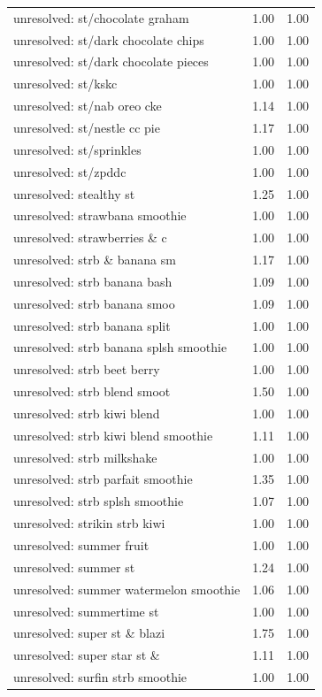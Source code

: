 \begin{table}
\begin{tabular}{lrr}
unresolved: st/chocolate graham & 1.00 & 1.00 \\
unresolved: st/dark chocolate chips & 1.00 & 1.00 \\
unresolved: st/dark chocolate pieces & 1.00 & 1.00 \\
unresolved: st/kskc & 1.00 & 1.00 \\
unresolved: st/nab oreo cke & 1.14 & 1.00 \\
unresolved: st/nestle cc pie & 1.17 & 1.00 \\
unresolved: st/sprinkles & 1.00 & 1.00 \\
unresolved: st/zpddc & 1.00 & 1.00 \\
unresolved: stealthy st & 1.25 & 1.00 \\
unresolved: strawbana smoothie & 1.00 & 1.00 \\
unresolved: strawberries \& c & 1.00 & 1.00 \\
unresolved: strb \& banana sm & 1.17 & 1.00 \\
unresolved: strb banana bash & 1.09 & 1.00 \\
unresolved: strb banana smoo & 1.09 & 1.00 \\
unresolved: strb banana split & 1.00 & 1.00 \\
unresolved: strb banana splsh smoothie & 1.00 & 1.00 \\
unresolved: strb beet berry & 1.00 & 1.00 \\
unresolved: strb blend smoot & 1.50 & 1.00 \\
unresolved: strb kiwi blend & 1.00 & 1.00 \\
unresolved: strb kiwi blend smoothie & 1.11 & 1.00 \\
unresolved: strb milkshake & 1.00 & 1.00 \\
unresolved: strb parfait smoothie & 1.35 & 1.00 \\
unresolved: strb splsh smoothie & 1.07 & 1.00 \\
unresolved: strikin strb kiwi & 1.00 & 1.00 \\
unresolved: summer fruit & 1.00 & 1.00 \\
unresolved: summer st & 1.24 & 1.00 \\
unresolved: summer watermelon smoothie & 1.06 & 1.00 \\
unresolved: summertime st & 1.00 & 1.00 \\
unresolved: super st \& blazi & 1.75 & 1.00 \\
unresolved: super star st \& & 1.11 & 1.00 \\
unresolved: surfin strb smoothie & 1.00 & 1.00 \\

\end{tabular}
\end{table}

